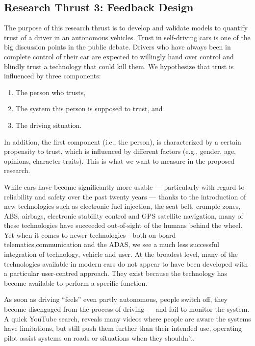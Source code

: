 \subsection{Research Thrust 3: Feedback Design}
\label{sec:trust}

The purpose of this research thrust is to develop and validate models to quantify trust of a driver in an autonomous vehicles.
Trust in self-driving cars is one of the big discussion points in the public debate. 
Drivers who have always been in complete control of their car are expected to willingly hand over control and blindly trust a technology that could kill them.
We hypothesize that trust is influenced by three components:
\begin{enumerate}[itemsep=0pt,parsep=0pt,topsep=4pt,leftmargin=0.4in]
    \item The person who trusts,
    \item The system this person is supposed to trust, and
    \item The driving situation.
\end{enumerate}

In addition, the first component (i.e., the person), is characterized by a certain propensity to trust, which is influenced by different factors (e.g., gender, age, opinions, character traits). This is what we want to measure in the proposed research. 

While cars have become significantly more usable — particularly with regard to reliability and safety over the past twenty years — thanks to the introduction of new technologies such as electronic fuel injection, the seat belt, crumple zones, ABS, airbags, electronic stability control and GPS satellite navigation, many of these technologies have succeeded out-of-sight of the humans behind the wheel.
Yet when it comes to newer technologies - both on-board telematics,communication and the ADAS, we see a much less successful integration of technology, vehicle and user.
At the broadest level, many of the technologies available in modern cars do not appear to have been developed with a particular user-centred approach. 
They exist because the technology has become available to perform a specific function.

As soon as driving ``feels'' even partly autonomous, people switch off, they become disengaged from the process of driving — and fail to monitor the system. 
A quick YouTube search, reveals many videos where people are aware the systems have limitations, but still push them further than their intended use, operating pilot assist systems on roads or situations when they shouldn't.

